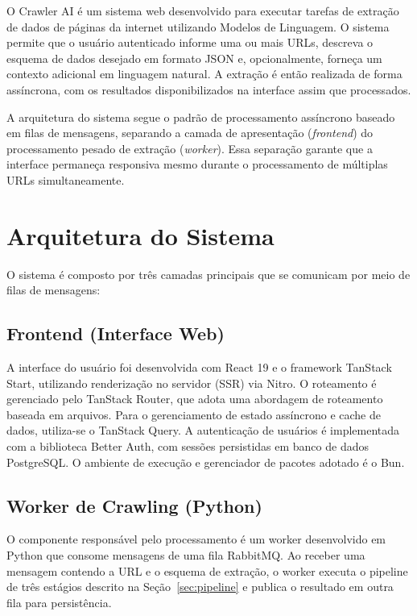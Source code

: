 \documentclass[tcc,capa]{texifsul}
\begin{document}
O Crawler AI é um sistema web desenvolvido para executar tarefas de extração de dados de páginas da internet utilizando Modelos de Linguagem. O sistema permite que o usuário autenticado informe uma ou mais URLs, descreva o esquema de dados desejado em formato JSON e, opcionalmente, forneça um contexto adicional em linguagem natural. A extração é então realizada de forma assíncrona, com os resultados disponibilizados na interface assim que processados.

A arquitetura do sistema segue o padrão de processamento assíncrono baseado em filas de mensagens, separando a camada de apresentação (\textit{frontend}) do processamento pesado de extração (\textit{worker}). Essa separação garante que a interface permaneça responsiva mesmo durante o processamento de múltiplas URLs simultaneamente.

\section{Arquitetura do Sistema}


O sistema é composto por três camadas principais que se comunicam por meio de filas de mensagens:

\subsection{Frontend (Interface Web)}

A interface do usuário foi desenvolvida com React 19 e o framework TanStack Start, utilizando renderização no servidor (SSR) via Nitro. O roteamento é gerenciado pelo TanStack Router, que adota uma abordagem de roteamento baseada em arquivos. Para o gerenciamento de estado assíncrono e cache de dados, utiliza-se o TanStack Query. A autenticação de usuários é implementada com a biblioteca Better Auth, com sessões persistidas em banco de dados PostgreSQL. O ambiente de execução e gerenciador de pacotes adotado é o Bun.

\subsection{Worker de Crawling (Python)}

O componente responsável pelo processamento é um worker desenvolvido em Python que consome mensagens de uma fila RabbitMQ. Ao receber uma mensagem contendo a URL e o esquema de extração, o worker executa o pipeline de três estágios descrito na Seção~\ref{sec:pipeline} e publica o resultado em outra fila para persistência.
\end{document}
